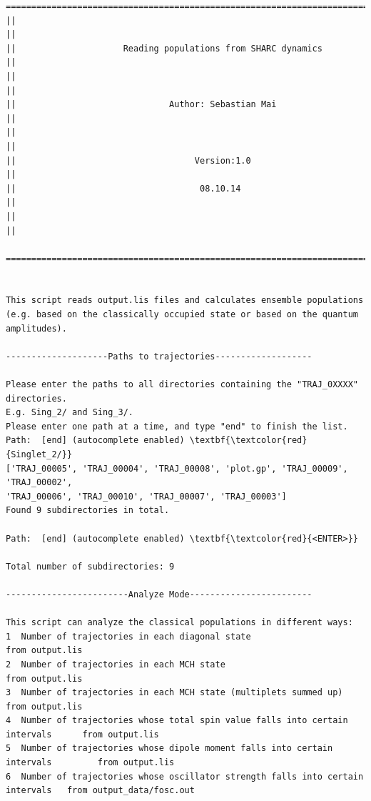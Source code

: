 \documentclass[a4paper,11pt,DIV=15,openany]{scrbook}
\begin{document}
\begin{oframed}
\footnotesize\begin{Verbatim}[commandchars=\\\{\}]
  ================================================================================
||                                                                                ||
||                     Reading populations from SHARC dynamics                    ||
||                                                                                ||
||                              Author: Sebastian Mai                             ||
||                                                                                ||
||                                   Version:1.0                                  ||
||                                    08.10.14                                    ||
||                                                                                ||
  ================================================================================


This script reads output.lis files and calculates ensemble populations 
(e.g. based on the classically occupied state or based on the quantum amplitudes).
  
--------------------Paths to trajectories-------------------

Please enter the paths to all directories containing the "TRAJ_0XXXX" directories.
E.g. Sing_2/ and Sing_3/. 
Please enter one path at a time, and type "end" to finish the list.
Path:  [end] (autocomplete enabled) \textbf{\textcolor{red}{Singlet_2/}}
['TRAJ_00005', 'TRAJ_00004', 'TRAJ_00008', 'plot.gp', 'TRAJ_00009', 'TRAJ_00002', 
'TRAJ_00006', 'TRAJ_00010', 'TRAJ_00007', 'TRAJ_00003']
Found 9 subdirectories in total.

Path:  [end] (autocomplete enabled) \textbf{\textcolor{red}{<ENTER>}}

Total number of subdirectories: 9

------------------------Analyze Mode------------------------

This script can analyze the classical populations in different ways:
1  Number of trajectories in each diagonal state                                   from output.lis
2  Number of trajectories in each MCH state                                        from output.lis
3  Number of trajectories in each MCH state (multiplets summed up)                 from output.lis
4  Number of trajectories whose total spin value falls into certain intervals      from output.lis
5  Number of trajectories whose dipole moment falls into certain intervals         from output.lis
6  Number of trajectories whose oscillator strength falls into certain intervals   from output_data/fosc.out


\end{Verbatim}
\end{oframed}
\end{document}
